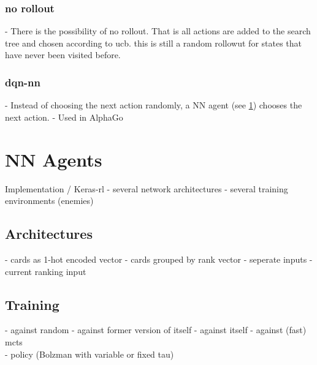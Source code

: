 \subsubsection{no rollout}
- There is the possibility of no rollout. That is all actions are added to the search tree and chosen according to ucb. this is still a random rollowut for states that have never been visited before.

\subsubsection{dqn-nn}
- Instead of choosing the next action randomly, a NN agent (see \ref{sec:nn_agents}) chooses the next action.
- Used in AlphaGo




\section{NN Agents}
\label{sec:nn_agents}
Implementation / Keras-rl
- several network architectures
- several training environments (enemies)


\subsection{Architectures}
- cards as 1-hot encoded vector
- cards grouped by rank vector
- seperate inputs
- current ranking input

\subsection{Training}
- against random
- against former version of itself
- against itself
- against (fast) mcts \\

- policy (Bolzman with variable or fixed tau)

